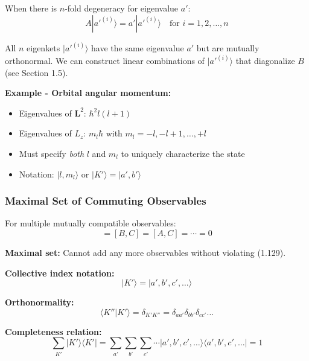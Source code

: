 \documentclass[11pt,a4paper]{article}
\begin{document}
When there is $n$-fold degeneracy for eigenvalue $a'$:
\begin{equation}
A|a'^{(i)}\rangle = a'|a'^{(i)}\rangle \quad \text{for } i = 1, 2, \ldots, n
\tag{1.126}
\end{equation}

All $n$ eigenkets $|a'^{(i)}\rangle$ have the same eigenvalue $a'$ but are mutually orthonormal. We can construct linear combinations of $|a'^{(i)}\rangle$ that diagonalize $B$ (see Section 1.5).

\textbf{Example - Orbital angular momentum:}
\begin{itemize}
\item Eigenvalues of $\mathbf{L}^2$: $\hbar^2 l(l+1)$
\item Eigenvalues of $L_z$: $m_l\hbar$ with $m_l = -l, -l+1, \ldots, +l$
\item Must specify \textit{both} $l$ and $m_l$ to uniquely characterize the state
\item Notation: $|l, m_l\rangle$ or $|K'\rangle = |a', b'\rangle$
\end{itemize}

\subsubsection{Maximal Set of Commuting Observables}

For multiple mutually compatible observables:
\begin{equation}
[A, B] = [B, C] = [A, C] = \cdots = 0
\tag{1.129}
\end{equation}

\textbf{Maximal set:} Cannot add any more observables without violating (1.129).

\textbf{Collective index notation:}
\begin{equation}
|K'\rangle = |a', b', c', \ldots\rangle
\tag{1.130}
\end{equation}

\textbf{Orthonormality:}
\begin{equation}
\langle K''|K'\rangle = \delta_{K'K''} = \delta_{aa'}\delta_{bb'}\delta_{cc'}\ldots
\tag{1.131}
\end{equation}

\textbf{Completeness relation:}
\begin{equation}
\sum_{K'}|K'\rangle\langle K'| = \sum_{a'}\sum_{b'}\sum_{c'}\cdots |a', b', c', \ldots\rangle\langle a', b', c', \ldots| = 1
\tag{1.132}
\end{equation}
\end{document}
